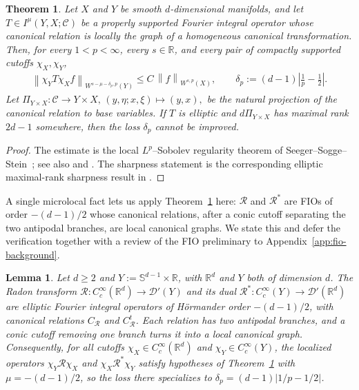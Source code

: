 \documentclass[12pt]{article}
\numberwithin{equation}{section}
\newtheorem{theorem}{Theorem}[section]
\newtheorem{lemma}{Lemma}[section]
\numberwithin{figure}{section}
\numberwithin{equation}{section}
\newcommand{\R}{\mathbb{R}}
\newcommand{\Sph}{\mathbb S}
\newcommand{\norm}[1]{\left\|#1\right\|}
\newcommand{\abs}[1]{\left|#1\right|}
\begin{document}
\begin{theorem}
\label{thm:sss-fio-lp}
Let $X$ and $Y$ be smooth $d$-dimensional manifolds, and let
$T\in I^\mu(Y,X;\mathcal{C})$ be a properly supported Fourier integral operator whose
canonical relation is locally the graph of a homogeneous canonical transformation.
Then, for every $1<p<\infty$, every $s\in\R$, and every pair of compactly
supported cutoffs $\chi_X,\chi_Y$,
\begin{align*}
    \norm{\chi_YT\chi_X f}_{W^{s-\mu-\delta_p,p}(Y)}
    \le C\,\norm{f}_{W^{s,p}(X)},
    \qquad
    \delta_p:=(d-1)\abs{\frac1p-\frac12}.
\end{align*}
Let $\Pi_{Y\times X}:\mathcal{C}\longrightarrow Y\times X, \,
    (y,\eta;x,\xi)\longmapsto (y,x),$
be the natural projection of the canonical relation to base variables. If $T$ is
elliptic and $d\Pi_{Y\times X}$ has maximal rank $2d-1$ somewhere, then
the loss $\delta_p$ cannot be improved.
\end{theorem}

\begin{proof}
The estimate is the local $L^p$--Sobolev regularity theorem of
Seeger--Sogge--Stein~\cite[Corollary~2.4]{seeger1991regularity}; see also
\cite[Ch.~IX, Sec.~4]{stein_harmonicanalysis_1993} and
\cite[Ch.~6]{sogge_FourierIntegralsClassical_2017}.  The sharpness statement is
the corresponding elliptic maximal-rank sharpness result in
\cite{seeger1991regularity, ruzhansky_SharpnessSeegerSoggeSteinOrders_1999}.
\end{proof}

A single microlocal fact lets us apply Theorem~\ref{thm:sss-fio-lp} here: $\mathcal
R$ and $\mathcal R^*$ are FIOs of order $-(d-1)/2$ whose canonical relations, after
a conic cutoff separating the two antipodal branches, are local canonical graphs.
We state this and defer the verification together with a review of
the FIO preliminary to Appendix~\ref{app:fio-background}.

\begin{lemma}
\label{lem:radon-fio}
Let $d\ge2$ and $Y:=\Sph^{d-1}\times\R$, with $\R^d$ and $Y$ both of dimension $d$.
The Radon transform $\mathcal R:C_c^\infty(\R^d)\to\mathcal D'(Y)$ and its dual
$\mathcal R^*:C_c^\infty(Y)\to\mathcal D'(\R^d)$ are elliptic Fourier integral
operators of H\"ormander order $-(d-1)/2$, with canonical relations $C_{\mathcal R}$
and $C_{\mathcal R}^t$. Each relation has two antipodal branches, and a conic cutoff
removing one branch turns it into a local canonical graph. Consequently, for all
cutoffs $\chi_X\in C_c^\infty(\R^d)$ and $\chi_Y\in C_c^\infty(Y)$, the localized
operators $\chi_Y\mathcal R\chi_X$ and $\chi_X\mathcal R^*\chi_Y$ satisfy hypotheses of Theorem~\ref{thm:sss-fio-lp} with $\mu=-(d-1)/2$, so the
loss there specializes to $\delta_p=(d-1)\abs{1/p-1/2}$.
\end{lemma}
\end{document}
